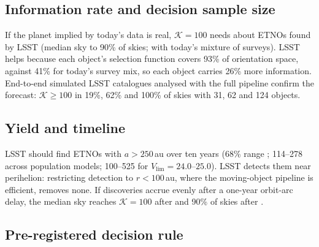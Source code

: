 \documentclass[twocolumn,linenumbers]{aastex631}
\newcommand{\Kbf}{\mathcal{K}}
\begin{document}
\subsection{Information rate and decision sample size}\label{sec:info}
If the planet implied by today's data is real, $\Kbf=100$ needs about \NKhundredLSST{} ETNOs found by LSST (median sky to 90\% of skies; \NKhundredCurrent{} with today's mixture of surveys). LSST helps because each object's selection function covers 93\% of orientation space, against 41\% for today's survey mix, so each object carries 26\% more information. End-to-end simulated LSST catalogues analysed with the full pipeline confirm the forecast: $\Kbf\ge100$ in 19\%, 62\% and 100\% of skies with 31, 62 and 124 objects.

\subsection{Yield and timeline}\label{sec:yield}
LSST should find \YieldLSST{} ETNOs with $a>250$\,au over ten years (68\% range \YieldLSSTrange{}; 114--278 across population models; 100--525 for $V_\mathrm{lim}=24.0$--$25.0$). LSST detects them near perihelion: restricting detection to $r<100$\,au, where the moving-object pipeline is efficient, removes none. If discoveries accrue evenly after a one-year orbit-arc delay, the median sky reaches $\Kbf=100$ after \YieldYearsMedian{} and 90\% of skies after \YieldYears{}.

\subsection{Pre-registered decision rule}\label{sec:prereg}
\end{document}
